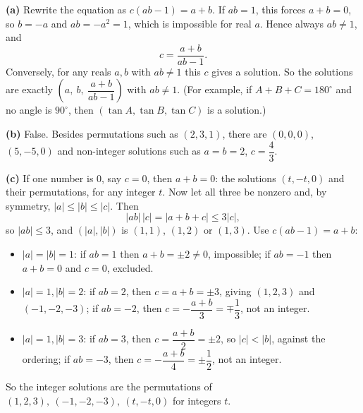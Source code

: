 \textbf{(a)} Rewrite the equation as $c(ab-1)=a+b$. If $ab=1$, this forces $a+b=0$, so $b=-a$ and $ab=-a^2=1$, which is impossible for real $a$. Hence always $ab\ne1$, and
\[c=\dfrac{a+b}{ab-1}.\]
Conversely, for any reals $a,b$ with $ab\ne1$ this $c$ gives a solution. So the solutions are exactly $\left(a,\ b,\ \dfrac{a+b}{ab-1}\right)$ with $ab\ne1$. (For example, if $A+B+C=180^\circ$ and no angle is $90^\circ$, then $(\tan A,\tan B,\tan C)$ is a solution.)

\textbf{(b)} False. Besides permutations such as $(2,3,1)$, there are $(0,0,0)$, $(5,-5,0)$ and non-integer solutions such as $a=b=2$, $c=\dfrac{4}{3}$.

\textbf{(c)} If one number is $0$, say $c=0$, then $a+b=0$: the solutions $(t,-t,0)$ and their permutations, for any integer $t$. Now let all three be nonzero and, by symmetry, $|a|\le|b|\le|c|$. Then
\[|ab|\,|c|=|a+b+c|\le3|c|,\]
so $|ab|\le3$, and $(|a|,|b|)$ is $(1,1)$, $(1,2)$ or $(1,3)$. Use $c(ab-1)=a+b$:
\begin{itemize}
\item $|a|=|b|=1$: if $ab=1$ then $a+b=\pm2\ne0$, impossible; if $ab=-1$ then $a+b=0$ and $c=0$, excluded.
\item $|a|=1,|b|=2$: if $ab=2$, then $c=a+b=\pm3$, giving $(1,2,3)$ and $(-1,-2,-3)$; if $ab=-2$, then $c=-\dfrac{a+b}{3}=\mp\dfrac{1}{3}$, not an integer.
\item $|a|=1,|b|=3$: if $ab=3$, then $c=\dfrac{a+b}{2}=\pm2$, so $|c|<|b|$, against the ordering; if $ab=-3$, then $c=-\dfrac{a+b}{4}=\pm\dfrac{1}{2}$, not an integer.
\end{itemize}
So the integer solutions are the permutations of $\boxed{(1,2,3),\ (-1,-2,-3),\ (t,-t,0)}$ for integers $t$.
